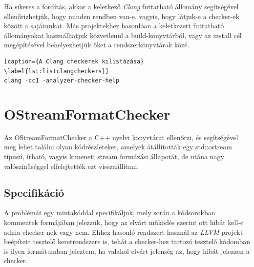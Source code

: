 \documentclass[a4paper,12pt]{report}
\begin{document}
Ha sikeres a fordítás, akkor a keletkező \emph{Clang} futtatható állomány segítségével ellenőrizhetjük, hogy minden rendben van-e, vagyis, hogy látjuk-e a checker-ek között a sajátunkat. Más projektekhez hasonlóan a keletkezett futtatható állományokat használhatjuk közvetlenül a build-könyvtárból, vagy az install cél megépítésével behelyezhetjük őket a rendszerkönyvtárak közé.

\begin{lstlisting}[caption={A Clang checkerek kilistázása}
\label{lst:listclangcheckers}]
clang -cc1 -analyzer-checker-help
\end{lstlisting}

\section{OStreamFormatChecker}
Az OStreamFormatChecker a C++ nyelvi könyvtárat ellenőrzi, és segítségével meg lehet találni olyan kódrészleteket, amelyek átállították egy std::ostream típusú, írható, vagyis kimeneti stream formázási állapotát, de utána nagy valószínűséggel elfelejtették ezt visszaállítani.

\subsection{Specifikáció}
A problémát egy mintakóddal specifikáljuk, mely során a kódsorokban kommentek formájában jelezzük, hogy az elvárt működés szerint ott hibát kell-e adnia checker-nek vagy nem. Ehhez hasonló rendszert használ az \emph{LLVM} projekt beépített tesztelő keretrendszere is, tehát a checker-hez tartozó tesztelő kódomban is ilyen formátumban jeleztem, ha valahol elvárt jelenség az, hogy hibát jelezzen a checker.
\end{document}
